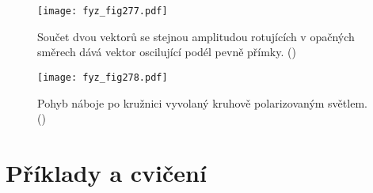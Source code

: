     
    \begin{figure}[ht!] %
      \centering
      \texttt{[image: fyz\_fig277.pdf]}
      \caption{Součet dvou vektorů se stejnou amplitudou rotujících v opačných směrech dává vektor
               oscilující podél pevně přímky. (\cite[s.~427]{Feynman01})}
      \label{fyz:fig277}
    \end{figure}
    
    \begin{figure}[ht!] %
      \centering
      \texttt{[image: fyz\_fig278.pdf]}
      \caption{Pohyb náboje po kružnici vyvolaný kruhově polarizovaným světlem.
               (\cite[s.~427]{Feynman01})}
      \label{fyz:fig278}
    \end{figure}

  \section{Příklady a cvičení}\label{fyz:IchapXXXIIIsecIX}

